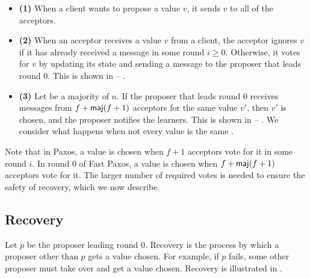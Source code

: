 \begin{itemize}
  \item \textbf{(1)}
    When a client wants to propose a value $v$, it sends $v$ to all of the
    acceptors.

  \item \textbf{(2)}
    When an acceptor receives a value $v$ from a client, the acceptor ignores
    $v$ if it has already received a message in some round $i \geq 0$.
    Otherwise, it votes for $v$ by updating its state and sending a
     message to the proposer that leads round $0$. This is
    shown in   --
    .

  \item \textbf{(3)}
    Let  be a majority of $n$.
    If the proposer that leads round $0$ receives  messages
    from $f + \textsf{maj}(f+1)$ acceptors for the same value $v'$, then $v'$ is
    chosen, and the proposer notifies the learners. This is shown in
      -- . We
    consider what happens when not every value is the same .
\end{itemize}

Note that in Paxos, a value is chosen when $f+1$ acceptors vote for it in some
round $i$. In round $0$ of Fast Paxos, a value is chosen when $f + \textsf{maj}(f+1)$
acceptors vote for it. The larger number of required votes is needed to ensure
the safety of recovery, which we now describe.

%
\subsection{Recovery}
Let $p$ be the proposer leading round $0$. Recovery is the process by which a
proposer other than $p$ gets a value chosen. For example, if $p$ fails, some
other proposer must take over and get a value chosen. Recovery is illustrated
in .

